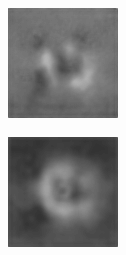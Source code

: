 \begin{figure}[H]
\begin{subfigure}[t]{0.13\textwidth}
  \end{subfigure}
  \begin{subfigure}[t]{0.13\textwidth}
    \centering
    \includegraphics[width=\linewidth]{img/one-trial/prediction_2_mse.png}
  \end{subfigure}
  \begin{subfigure}[t]{0.13\textwidth}
    \centering
    \includegraphics[width=\linewidth]{img/one-trial/prediction_2_ssim.png}

\end{subfigure}
\end{figure}
